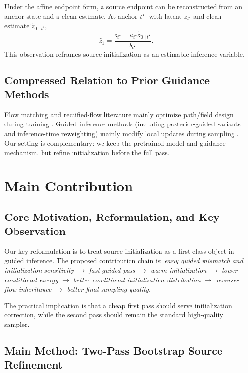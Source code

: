 \documentclass[letterpaper]{article} %
\begin{document}
Under the affine endpoint form, a source endpoint can be reconstructed from an anchor state and a clean estimate. At anchor $t^\star$, with latent $z_{t^\star}$ and clean estimate $\tilde z_{0\mid t^\star}$,
\begin{equation}
\hat z_1=\frac{z_{t^\star}-a_{t^\star}\tilde z_{0\mid t^\star}}{b_{t^\star}}.
\end{equation}
This observation reframes source initialization as an estimable inference variable.

\subsection{Compressed Relation to Prior Guidance Methods}

Flow matching and rectified-flow literature mainly optimize path/field design during training \citep{lipman2023flowmatching,liu2023rectifiedflow}. Guided inference methods (including posterior-guided variants and inference-time reweighting) mainly modify local updates during sampling \citep{chung2022dps,flowdps2024,cfgzero2024}. Our setting is complementary: we keep the pretrained model and guidance mechanism, but refine initialization before the full pass.

\section{Main Contribution}

\subsection{Core Motivation, Reformulation, and Key Observation}

Our key reformulation is to treat source initialization as a first-class object in guided inference. The proposed contribution chain is:
\emph{early guided mismatch and initialization sensitivity
$\rightarrow$ fast guided pass
$\rightarrow$ warm initialization
$\rightarrow$ lower conditional energy
$\rightarrow$ better conditional initialization distribution
$\rightarrow$ reverse-flow inheritance
$\rightarrow$ better final sampling quality.}

The practical implication is that a cheap first pass should serve initialization correction, while the second pass should remain the standard high-quality sampler.

\subsection{Main Method: Two-Pass Bootstrap Source Refinement}
\end{document}
